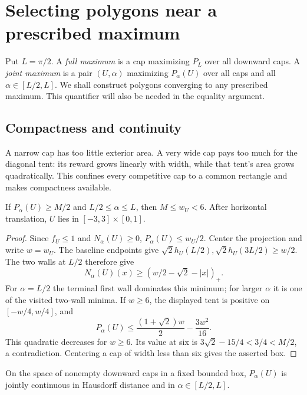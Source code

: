 \section{Selecting polygons near a prescribed maximum}\label{sec:selection}

Put $L=\pi/2$. A \emph{full maximum} is a cap maximizing $P_L$ over
all downward caps. A \emph{joint maximum} is a pair $(U,\alpha)$
maximizing $P_\alpha(U)$ over all caps and all $\alpha\in[L/2,L]$.
We shall construct polygons converging to any prescribed maximum.
This quantifier will also be needed in the equality argument.

\subsection{Compactness and continuity}

A narrow cap has too little exterior area. A very wide cap pays too much
for the diagonal tent: its reward grows linearly with width, while that
tent's area grows quadratically. This confines every competitive cap to
a common rectangle and makes compactness available.

\begin{lemma}\label{lem:selection-width}
If $P_\alpha(U)\ge M/2$ and $L/2\le\alpha\le L$, then
$M\le w_U<6$. After horizontal translation, $U$ lies in
$[-3,3]\times[0,1]$.
\end{lemma}

\begin{proof}
Since $f_U\le1$ and $N_\alpha(U)\ge0$, $P_\alpha(U)\le w_U/2$.
Center the projection and write $w=w_U$. The baseline endpoints give
$\sqrt2 h_U(L/2),\sqrt2 h_U(3L/2)\ge w/2$.
The two walls at $L/2$ therefore give
\[
 N_\alpha(U)(x)\ge(w/2-\sqrt2-|x|)_+.
\]
For $\alpha=L/2$ the terminal first wall dominates this minimum;
for larger $\alpha$ it is one of the visited two-wall minima.
If $w\ge6$, the displayed tent is positive on $[-w/4,w/4]$, and
\[
 P_\alpha(U)\le\frac{(1+\sqrt2)w}{2}-\frac{3w^2}{16}.
\]
This quadratic decreases for $w\ge6$. Its value at six is
$3\sqrt2-15/4<3/4<M/2$, a contradiction. Centering a cap of
width less than six gives the asserted box.
\end{proof}

\begin{lemma}\label{lem:selection-continuity}
On the space of nonempty downward caps in a fixed bounded box,
$P_\alpha(U)$ is jointly continuous in Hausdorff distance and in
$\alpha\in[L/2,L]$.
\end{lemma}

